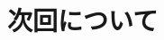 \documentclass[11pt]{jsarticle}
\begin{document}
	\section{次回について}
		
	\newpage
\vspace{10cm}
	

\vspace{14cm}
	\articleSPRfour
	\articleSPRfive
\end{document}
